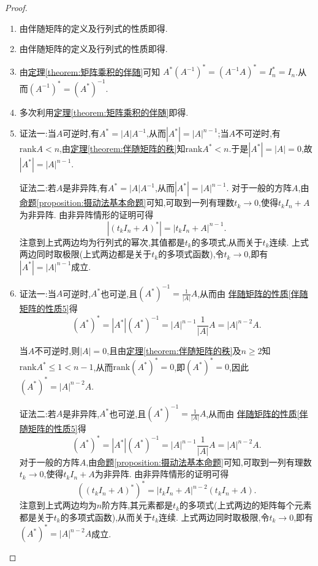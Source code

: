 \documentclass[../../main.tex]{subfiles}%
\begin{document}
\begin{proof}
\begin{enumerate}
\item 由伴随矩阵的定义及行列式的性质即得.

\item 由伴随矩阵的定义及行列式的性质即得.

\item 由\hyperref[theorem:矩阵乘积的伴随]{定理\ref{theorem:矩阵乘积的伴随}}可知
$A^*\left( A^{-1} \right) ^*=\left( A^{-1}A \right) ^*=I_{n}^{*}=I_n$.从而$(A^{-1})^* = (A^*)^{-1}$.

\item 多次利用\hyperref[theorem:矩阵乘积的伴随]{定理\ref{theorem:矩阵乘积的伴随}}即得.

\item {\color{blue}证法一:}当\(A\)可逆时,有\(A^* = |A|A^{-1}\),从而\(|A^*| = |A|^{n - 1}\);当\(A\)不可逆时,有$\mathrm{rank}A<n$,由\hyperref[theorem:伴随矩阵的秩]{定理\ref{theorem:伴随矩阵的秩}}知$\mathrm{rank}A^*<n$.于是\(|A^*| = |A| = 0\),故\(|A^*| = |A|^{n - 1}\).

{\color{blue}证法二:}若\(A\)是非异阵,有\(A^* = |A|A^{-1}\),从而\(|A^*| = |A|^{n - 1}\). 对于一般的方阵\(A\),由\hyperref[proposition:摄动法基本命题]{命题\ref{proposition:摄动法基本命题}}可知,可取到一列有理数\(t_k\rightarrow0\),使得\(t_kI_n + A\)为非异阵. 由非异阵情形的证明可得
\[
|(t_kI_n + A)^*| = |t_kI_n + A|^{n - 1}.
\]
注意到上式两边均为行列式的幂次,其值都是\(t_k\)的多项式,从而关于\(t_k\)连续. 上式两边同时取极限(上式两边都是关于$t_k$的多项式函数),令\(t_k\rightarrow0\),即有\(|A^*| = |A|^{n - 1}\)成立.

\item {\color{blue}证法一:}当\(A\)可逆时,\(A^*\)也可逆,且\((A^*)^{-1} = \frac{1}{|A|}A\),从而由 \hyperref[伴随矩阵的性质5]{伴随矩阵的性质\ref{伴随矩阵的性质5}}得
\[
(A^*)^* = |A^*|(A^*)^{-1} = |A|^{n - 1}\frac{1}{|A|}A = |A|^{n - 2}A.
\]

当\(A\)不可逆时,则\(|A| = 0\),且由\hyperref[theorem:伴随矩阵的秩]{定理\ref{theorem:伴随矩阵的秩}}及$n\geqslant  2$知\(\mathrm{rank}A^* \leqslant  1<n-1\),从而\(\mathrm{rank}(A^*)^* = 0\),即\((A^*)^* = 0\),因此\((A^*)^* = |A|^{n - 2}A\).

{\color{blue}证法二:}若\(A\)是非异阵,\(A^*\)也可逆,且\((A^*)^{-1} = \frac{1}{|A|}A\),从而由 \hyperref[伴随矩阵的性质5]{伴随矩阵的性质\ref{伴随矩阵的性质5}}得
\[
(A^*)^* = |A^*|(A^*)^{-1} = |A|^{n - 1}\frac{1}{|A|}A = |A|^{n - 2}A.
\]
对于一般的方阵\(A\),由\hyperref[proposition:摄动法基本命题]{命题\ref{proposition:摄动法基本命题}}可知,可取到一列有理数\(t_k\rightarrow0\),使得\(t_kI_n + A\)为非异阵. 由非异阵情形的证明可得
\[
((t_kI_n + A)^*)^* = |t_kI_n + A|^{n - 2}(t_kI_n + A).
\]
注意到上式两边均为\(n\)阶方阵,其元素都是\(t_k\)的多项式(上式两边的矩阵每个元素都是关于$t_k$的多项式函数),从而关于\(t_k\)连续. 上式两边同时取极限,令\(t_k\rightarrow0\),即有\((A^*)^* = |A|^{n - 2}A\)成立. 
\end{enumerate}
\end{proof}
\end{document}
